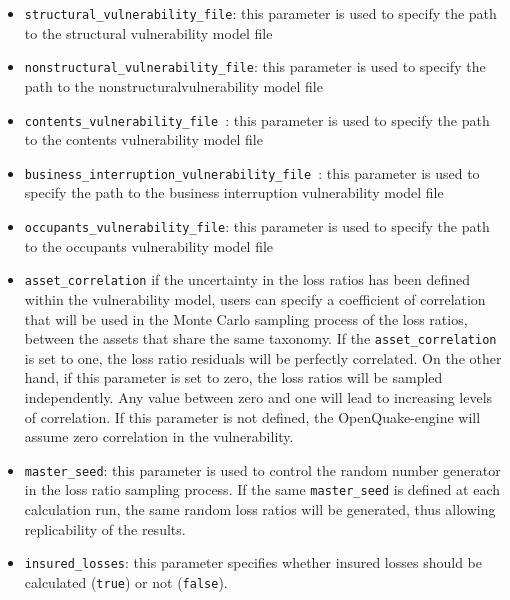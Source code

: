 \begin{itemize}

  \item \Verb+structural_vulnerability_file+: this parameter is used to
    specify the path to the structural \gls{vulnerability model} file

  \item \Verb+nonstructural_vulnerability_file+: this parameter is used to
    specify the path to the nonstructural\gls{vulnerability model} file

  \item \Verb+contents_vulnerability_file +: this parameter is used to
    specify the path to the contents \gls{vulnerability model} file

  \item \Verb+business_interruption_vulnerability_file +: this parameter is
    used to specify the path to the business interruption
    \gls{vulnerability model} file

  \item \Verb+occupants_vulnerability_file+: this parameter is used to
    specify the path to the occupants \gls{vulnerability model} file

  \item \texttt{asset\_correlation} if the uncertainty in the loss ratios
    has been defined within the \gls{vulnerability model}, users can specify
    a coefficient of correlation that will be used in the Monte Carlo sampling
    process of the loss ratios, between the assets that share the same
    \gls{taxonomy}. If the \texttt{asset\_correlation} is set to one,
    the loss ratio residuals will be perfectly correlated. On the other hand,
    if this parameter is set to zero, the loss ratios will be sampled
    independently. Any value between zero and one will lead to increasing
    levels of correlation. If this parameter is not defined, the
    OpenQuake-engine will assume zero correlation in the vulnerability.

  \item \Verb+master_seed+: this parameter is used to control the random
    number generator in the loss ratio sampling process. If the same
    \Verb+master_seed+ is defined at each calculation run, the same random loss
    ratios will be generated, thus allowing replicability of the results.

  \item \Verb+insured_losses+: this parameter specifies whether insured losses
    should be calculated (\Verb+true+) or not (\Verb+false+).

\end{itemize}